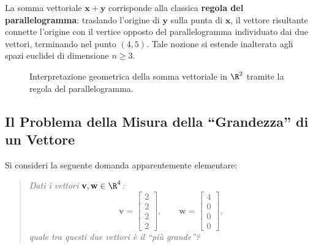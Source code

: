 La somma vettoriale $\mathbf{x} + \mathbf{y}$ corrisponde alla classica \textbf{regola del parallelogramma}: traslando l'origine di $\mathbf{y}$ sulla punta di $\mathbf{x}$, il vettore risultante connette l'origine con il vertice opposto del parallelogramma individuato dai due vettori, terminando nel punto $(4, 5)$. Tale nozione si estende inalterata agli spazi euclidei di dimensione $n \ge 3$.

\begin{figure}[H]
\centering
{}
\caption{Interpretazione geometrica della somma vettoriale in $\R^2$ tramite la regola del parallelogramma.}
\label{fig:parallelogram-rule}
\end{figure}

\subsection{Il Problema della Misura della ``Grandezza'' di un Vettore}

Si consideri la seguente domanda apparentemente elementare:
\begin{quote}
    \textit{Dati i vettori $\mathbf{v}, \mathbf{w} \in \R^4$:}
    \begin{equation}
        \mathbf{v} = \begin{bmatrix} 2 \\ 2 \\ 2 \\ 2 \end{bmatrix}, \qquad \mathbf{w} = \begin{bmatrix} 4 \\ 0 \\ 0 \\ 0 \end{bmatrix},
    \end{equation}
    \textit{quale tra questi due vettori è il ``più grande''?}
\end{quote}

